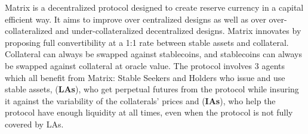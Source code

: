 \documentclass[%
 reprint,
nofootinbib,
 amsmath,amssymb,
 aps,
]{revtex4-2}
\begin{document}
Matrix is a decentralized protocol designed to create reserve currency in a capital efficient way. It aims to improve over centralized designs as well as over over-collateralized and under-collateralized decentralized designs. Matrix innovates by proposing full convertibility at a 1:1 rate between stable assets and collateral. Collateral can always be swapped against stablecoins, and stablecoins can always be swapped against collateral at oracle value. The protocol involves 3 agents which all benefit from Matrix: Stable Seekers and Holders who issue and use stable assets, (\textbf{LAs}), who get perpetual futures from the protocol while insuring it against the variability of the collaterals’ prices and (\textbf{IAs}), who help the protocol have enough liquidity at all times, even when the protocol is not fully covered by LAs.
\end{document}
